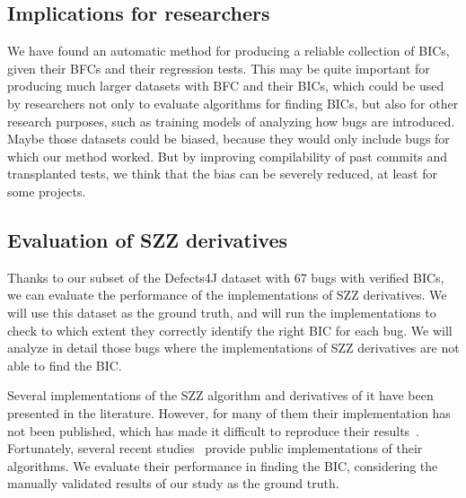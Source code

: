 \subsection{Implications for researchers}
\label{sec:implications-researchers}

We have found an automatic method for producing a reliable collection of BICs, given their BFCs and their regression tests. 
This may be quite important for producing much larger datasets with BFC and their BICs, which could be used by researchers not only to evaluate algorithms for finding BICs, but also for other research purposes, such as training models of analyzing how bugs are introduced. Maybe those datasets could be biased, because they would only include bugs for which our method worked. But by improving compilability of past commits and transplanted tests, we think that the bias can be severely reduced, at least for some projects.

\subsection{Evaluation of SZZ derivatives}
\label{subsec:szz-tools}

Thanks to our subset of the Defects4J dataset with 67 bugs with verified BICs, we can evaluate the performance of the implementations of SZZ derivatives. 
We will use this dataset as the ground truth, and will run the implementations to check to which extent they correctly identify the right BIC for each bug.
We will analyze in detail those bugs where the implementations of SZZ derivatives are not able to find the BIC.

Several implementations of the SZZ algorithm and derivatives of it have been presented in the literature. However, for many of them their implementation has not been published, which has made it difficult to reproduce their results~\cite{rodriguez2018reproducibility}. 
Fortunately, several recent studies~\cite{borg2019szz,lenarduzzi2020openszz,pokropinski2022szz,rosa2021evaluating} provide public implementations of their algorithms. 
We evaluate their performance in finding the BIC, considering the manually validated results of our study as the ground truth.

